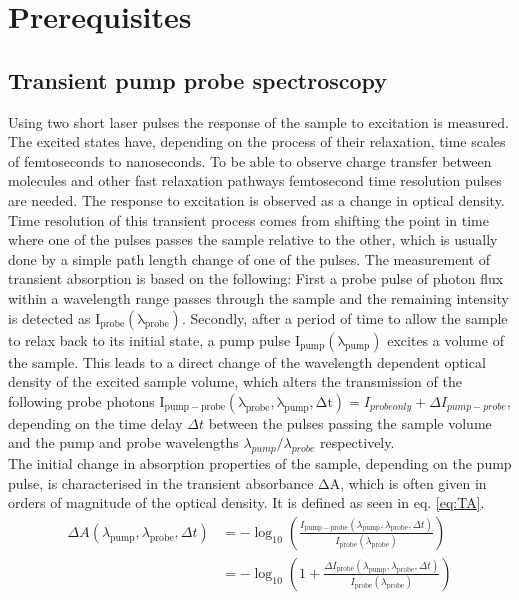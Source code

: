 \documentclass[twoside,openright]{scrreprt}
\begin{document}
\chapter{Prerequisites}

\section{Transient pump probe spectroscopy}
Using two short laser pulses the response of the sample to excitation is measured. The excited states have, depending on the process of their relaxation, time scales of femtoseconds to nanoseconds. To be able to observe charge transfer between molecules and other fast relaxation pathways femtosecond time resolution pulses are needed. The response to excitation is observed as a change in optical density. Time resolution of this transient process comes from shifting the point in time where one of the pulses passes the sample relative to the other, which is usually done by a simple path length change of one of the pulses.\newline
The measurement of transient absorption is based on the following: First a probe pulse of photon flux within a wavelength range passes through the sample and the remaining intensity is detected as $\mathrm{I_{probe}(\lambda_{probe})}$. 
Secondly, after a period of time to allow the sample to relax back to its initial state, a pump pulse $\mathrm{I_{pump}(\lambda_{pump})}$ excites a volume of the sample. This leads to a direct change of the wavelength dependent optical density of the excited sample volume, which alters the transmission of the following probe photons $\mathrm{I_{pump-probe}(\lambda_{probe}, \lambda_{pump}, \Delta t)} = I_{probe only}+\Delta I_{pump-probe}$, depending on the time delay $\Delta t$ between the pulses passing the sample volume and the pump and probe wavelengths $\lambda_{pump}/\lambda_{probe}$ respectively. \\
The initial change in absorption properties of the sample, depending on the pump pulse, is characterised in the transient absorbance $\mathrm{\Delta A}$, which is often given in orders of magnitude of the optical density. It is defined as seen in eq. \ref{eq:TA}.
\begin{equation}\label{eq:TA}
\begin{split}
\Delta A(\lambda_{\mathrm{pump}}, \lambda_{\mathrm{probe}}, \Delta t)&=-\log _{10}\left(\frac{I_{\mathrm{pump}-\mathrm{probe}}\left(\lambda_{\mathrm{pump}}, \lambda_{\mathrm{probe}}, \Delta t\right)}{I_{\mathrm{probe}}\left(\lambda_{\mathrm{probe}}\right)}\right)\\
&=-\log _{10}\left(1+\frac{\Delta I_{\mathrm{probe}}\left(\lambda_{\mathrm{pump}}, \lambda_{\mathrm{probe}}, \Delta t\right)}{I_{\mathrm{probe}}\left(\lambda_{\mathrm{probe}}\right)}\right)
\end{split}
\end{equation}
\end{document}
